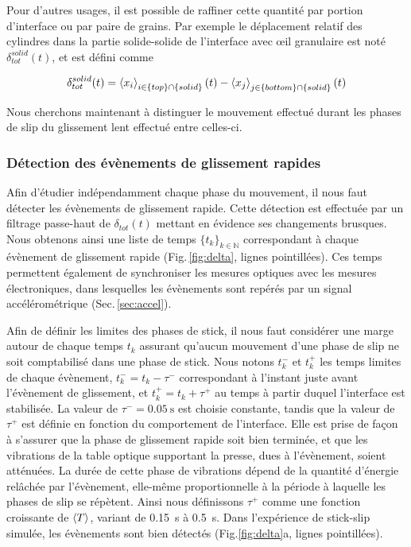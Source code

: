 Pour d'autres usages, il est possible de raffiner cette quantité par portion d'interface ou par paire de grains. Par exemple le déplacement relatif des  cylindres dans la partie solide-solide de l'interface avec œil granulaire est noté $\delta_{tot}^{solid}(t)$, et est défini comme

\begin{equation}
\delta_{tot}^{solid}(t) = \left\langle {x_i} \right\rangle_{i\in\{top\}\cap\{solid\}}(t) - \left\langle {x_j} \right\rangle_{j\in\{bottom\}\cap\{solid\}}(t)
\end{equation}

Nous cherchons maintenant à distinguer le mouvement effectué durant les phases de slip du glissement lent effectué entre celles-ci.


\subsubsection{Détection des évènements de glissement rapides}
\label{sec:detecoptique}

Afin d'étudier indépendamment chaque phase du mouvement, il nous faut détecter les évènements de glissement rapide. Cette détection est effectuée par un filtrage passe-haut de $\delta_{tot}(t)$ mettant en évidence ses changements brusques. Nous obtenons ainsi une liste de temps $\{t_{k}\}_{k\in\mathbb{N}}$ correspondant à chaque évènement de glissement rapide (Fig.\,\ref{fig:delta}, lignes pointillées). Ces temps permettent également de synchroniser les mesures optiques avec les mesures électroniques, dans lesquelles les évènements sont repérés par un signal accélérométrique (Sec.\,\ref{sec:accel}).

Afin de définir les limites des phases de stick, il nous faut considérer une marge autour de chaque temps $t_k$ assurant qu'aucun mouvement d'une phase de slip ne soit comptabilisé dans une phase de stick. Nous notons $t_k^-$ et $t_k^+$ les temps limites de chaque évènement, $t_k^- = t_k-\tau^-$ correspondant à l'instant juste avant l'évènement de glissement, et $t_k^+ = t_k+\tau^+$ au temps à partir duquel l'interface est stabilisée. La valeur de $\tau^-=\SI{0.05}{\second}$ est choisie constante, tandis que la valeur de $\tau^+$ est définie en fonction du comportement de l'interface. Elle est prise de façon à s'assurer que la phase de glissement rapide soit bien terminée, et que les vibrations de la table optique supportant la presse, dues à l'évènement, soient atténuées. La durée de cette phase de vibrations dépend de la quantité d'énergie relâchée par l'évènement, elle-même proportionnelle à la période à laquelle les phases de slip se répètent. Ainsi nous définissons $\tau^+$ comme une fonction croissante de $\left\langle {T} \right\rangle$, variant de \SI{0.15}{\second} à \SI{0.5}{\second}. Dans l'expérience de stick-slip simulée, les évènements sont bien détectés (Fig.\ref{fig:delta}a, lignes pointillées).



